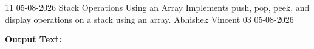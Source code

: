 \clearpage
\label{prog:11}
\programhead
  {11}
  {05-08-2026}
  {Stack Operations Using an Array}
  {Implements push, pop, peek, and display operations on a stack using an array.}
  {Abhishek Vincent}
  {03}
  {05-08-2026}

\divider
\textbf{Output Text:}\par
\vspace{2pt}

